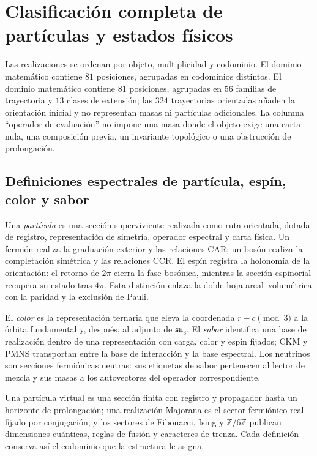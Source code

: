 \section{Clasificación completa de partículas y estados físicos}
\label{sec:catalogo-realizaciones-tipadas-rev8}

Las realizaciones se ordenan por objeto, multiplicidad y codominio. El dominio matemático contiene \(81\) posiciones, agrupadas en
codominios distintos. El dominio matemático contiene \(81\) posiciones, agrupadas en
\(56\) familias de trayectoria y \(13\) clases de extensión; las \(324\)
trayectorias orientadas añaden la orientación inicial y no representan masas
ni partículas adicionales. La columna ``operador de evaluación'' no impone una masa donde el objeto exige
una carta nula, una composición previa, un invariante topológico o una
obstrucción de prolongación.

\subsection{Definiciones espectrales de partícula, espín, color y sabor}

Una \emph{partícula} es una sección superviviente realizada como ruta
orientada, dotada de registro, representación de simetría, operador espectral
y carta física. Un fermión realiza la graduación exterior y las relaciones
CAR; un bosón realiza la completación simétrica y las relaciones CCR. El
espín registra la holonomía de la orientación: el retorno de \(2\pi\) cierra
la fase bosónica, mientras la sección espinorial recupera su estado tras
\(4\pi\). Esta distinción enlaza la doble hoja areal--volumétrica con la
paridad y la exclusión de Pauli.

El \emph{color} es la representación ternaria que eleva la coordenada
\(r-c\pmod3\) a la órbita fundamental y, después, al adjunto de
\(\mathfrak{su}_3\). El \emph{sabor} identifica una base de realización
dentro de una representación con carga, color y espín fijados; CKM y PMNS
transportan entre la base de interacción y la base espectral. Los neutrinos
son secciones fermiónicas neutras: sus etiquetas de sabor pertenecen al
lector de mezcla y sus masas a los autovectores del operador correspondiente.

Una partícula virtual es una sección finita con registro y propagador hasta
un horizonte de prolongación; una realización Majorana es el sector
fermiónico real fijado por conjugación; y los sectores de Fibonacci, Ising y
\(\mathbb Z/6\mathbb Z\) publican dimensiones cuánticas, reglas de fusión y
caracteres de trenza. Cada definición conserva así el codominio que la
estructura le asigna.

